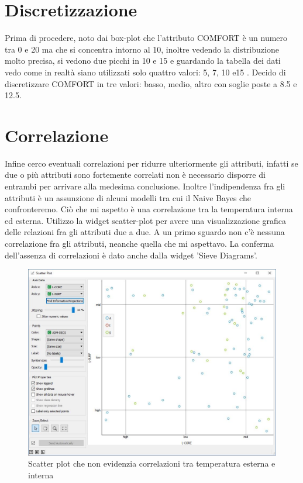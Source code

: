 \documentclass[a4paper, 12p]{report}
\begin{document}
\section{Discretizzazione}
Prima di procedere, noto dai box-plot che l'attributo COMFORT è un numero tra 0 e 20 ma che si concentra intorno al 10, inoltre vedendo la distribuzione molto precisa, si vedono due picchi in 10 e 15 e guardando la tabella dei dati vedo come in realtà siano utilizzati solo quattro valori: 5, 7, 10 e15 . Decido di discretizzare COMFORT in tre valori: basso, medio, altro con soglie poste a 8.5 e 12.5.
\section{Correlazione}
Infine cerco eventuali correlazioni per ridurre ulteriormente gli attributi, infatti se due o più attributi sono fortemente correlati non è necessario disporre di entrambi per arrivare alla medesima conclusione. Inoltre l'indipendenza fra gli attributi è un assunzione di alcuni modelli tra cui il Naive Bayes che confronteremo. Ciò che mi aspetto è una correlazione tra la temperatura interna ed esterna. Utilizzo la widget scatter-plot per avere una visualizzazione grafica delle relazioni fra gli attributi due a due. A un primo sguardo non c'è nessuna correlazione fra gli attributi, neanche quella che mi aspettavo. La conferma dell'assenza di correlazioni è dato anche dalla widget 'Sieve Diagrams'.  
\begin{figure}	
	\centering
	\includegraphics[scale = 0.4]{img/ScatterJPG.JPG}
	\caption{Scatter plot che non evidenzia correlazioni tra temperatura esterna e interna }\label{fig:4}
\end{figure}
\end{document}
